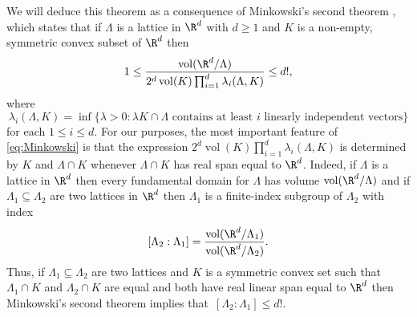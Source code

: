 We will deduce this theorem as a consequence of Minkowski's second theorem \cite[p. 203]{MR1434478}, which states that if $\Lambda$ is a lattice in $\R^d$ with $d\geq 1$ and $K$ is a non-empty, symmetric convex subset of $\R^d$ then
\begin{equation}
\label{eq:Minkowski}
 1 \leq \frac{\operatorname{vol}(\R^d/\Lambda)}{2^d \operatorname{vol}(K) \prod_{i=1}^d \lambda_i(\Lambda,K)} \leq d!,
\end{equation}
where 
\[
\lambda_i(\Lambda,K)=\inf\bigl\{\lambda>0: \lambda K \cap \Lambda \text{ contains at least $i$ linearly independent vectors}\bigr\}
\]
for each $1\leq i \leq d$. 
For our purposes, the most important feature of \eqref{eq:Minkowski} is that the expression $2^d \operatorname{vol}(K) \prod_{i=1}^d \lambda_i(\Lambda,K)$ is determined by $K$ and $\Lambda \cap K$ whenever $\Lambda \cap K$ has real span equal to $\R^d$. Indeed, if $\Lambda$ is a lattice in $\R^d$ then every fundamental domain for $\Lambda$ has volume $\operatorname{vol}(\R^d/\Lambda)$ and if $\Lambda_1 \subseteq \Lambda_2$ are two lattices in $\R^d$ then $\Lambda_1$ is a finite-index subgroup of $\Lambda_2$ with index
\[
[\Lambda_2:\Lambda_1] = \frac{\operatorname{vol}(\R^d/\Lambda_1)}{\operatorname{vol}(\R^d/\Lambda_2)}.
\] Thus, if $\Lambda_1 \subseteq \Lambda_2$ are two lattices and $K$ is a symmetric convex set such that $\Lambda_1 \cap K$ and $\Lambda_2 \cap K$ are equal and both have real linear span equal to $\R^d$ then Minkowski's second theorem implies that~$[\Lambda_2:\Lambda_1] \leq d!$.


